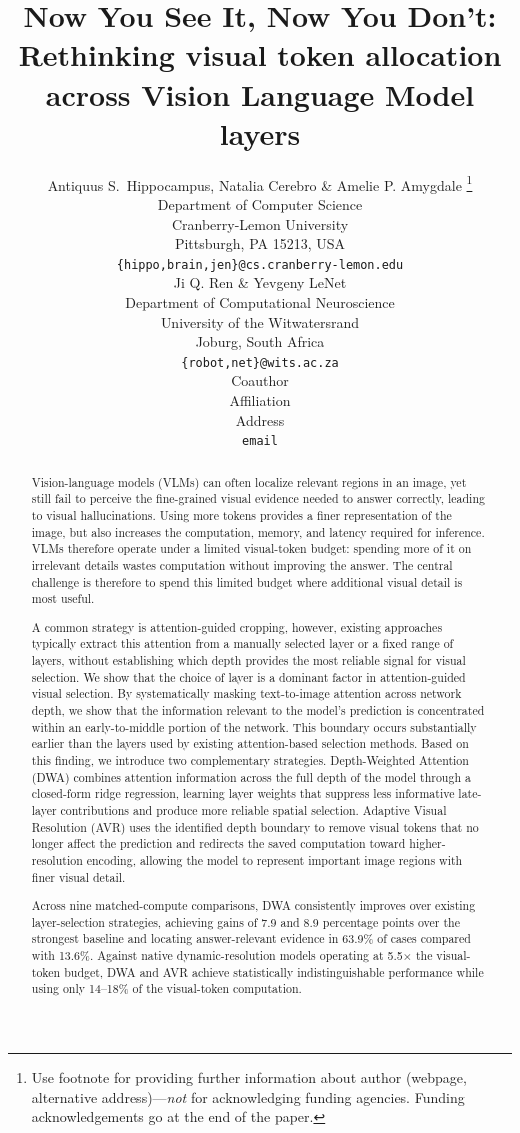 \documentclass{article} %
\title{Now You See It, Now You Don't: Rethinking visual token allocation across Vision Language Model layers}
\author{Antiquus S.~Hippocampus, Natalia Cerebro \& Amelie P. Amygdale \thanks{ Use footnote for providing further information
about author (webpage, alternative address)---\emph{not} for acknowledging
funding agencies.  Funding acknowledgements go at the end of the paper.} \\
Department of Computer Science\\
Cranberry-Lemon University\\
Pittsburgh, PA 15213, USA \\
\texttt{\{hippo,brain,jen\}@cs.cranberry-lemon.edu} \\
\And
Ji Q. Ren \& Yevgeny LeNet \\
Department of Computational Neuroscience \\
University of the Witwatersrand \\
Joburg, South Africa \\
\texttt{\{robot,net\}@wits.ac.za} \\
\AND
Coauthor \\
Affiliation \\
Address \\
\texttt{email}
}
\begin{document}
\maketitle

\begin{abstract}
Vision-language models (VLMs) can often localize relevant regions in an image, yet still fail to perceive the fine-grained visual evidence needed to answer correctly, leading to visual hallucinations. Using more tokens provides a finer representation of the image, but also increases the computation, memory, and latency required for inference. VLMs therefore operate under a limited visual-token budget: spending more of it on irrelevant details wastes computation without improving the answer. The central challenge is therefore to spend this limited budget where additional visual detail is most useful.

A common strategy is attention-guided cropping, however, existing approaches typically extract this attention from a manually selected layer or a fixed range of layers, without establishing which depth provides the most reliable signal for visual selection. We show that the choice of layer is a dominant factor in attention-guided visual selection. By systematically masking text-to-image attention across network depth, we show that the information relevant to the model's prediction is concentrated within an early-to-middle portion of the network. This boundary occurs substantially earlier than the layers used by existing attention-based selection methods. Based on this finding, we introduce two complementary strategies. Depth-Weighted Attention (DWA) combines attention information across the full depth of the model through a closed-form ridge regression, learning layer weights that suppress less informative late-layer contributions and produce more reliable spatial selection. Adaptive Visual Resolution (AVR) uses the identified depth boundary to remove visual tokens that no longer affect the prediction and redirects the saved computation toward higher-resolution encoding, allowing the model to represent important image regions with finer visual detail.

Across nine matched-compute comparisons, DWA consistently improves over existing layer-selection strategies, achieving gains of 7.9 and 8.9 percentage points over the strongest baseline and locating answer-relevant evidence in 63.9\% of cases compared with 13.6\%. Against native dynamic-resolution models operating at 5.5$\times$ the visual-token budget, DWA and AVR achieve statistically indistinguishable performance while using only 14--18\% of the visual-token computation.


\end{abstract}
\end{document}
